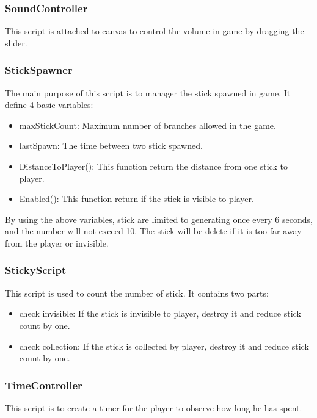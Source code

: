 \documentclass[12pt]{article}
\begin{document}
\subsubsection{SoundController}
This script is attached to canvas to control the volume in game by dragging the slider.

\subsubsection{StickSpawner}
The main purpose of this script is to manager the stick spawned in game. It define 4 basic variables:
\begin{itemize}
\item maxStickCount: Maximum number of branches allowed in the game.
\item lastSpawn: The time between two stick spawned.   
\item DistanceToPlayer(): This function return the distance from one stick to player.
\item Enabled(): This function return if the stick is visible to player.
\end{itemize}
By using the above variables, stick are limited to generating once every 6 seconds, and the number will not exceed 10. The stick will be delete if it is too far away from the player or invisible.

\subsubsection{StickyScript}
This script is used to count the number of stick. It contains two parts:
\begin{itemize}
\item check invisible: If the stick is invisible to player, destroy it and reduce stick count by one.
\item check collection: If the stick is collected by player, destroy it and reduce stick count by one.
\end{itemize}

\subsubsection{TimeController}

This script is to create a timer for the player to observe how long he has spent.
\end{document}
